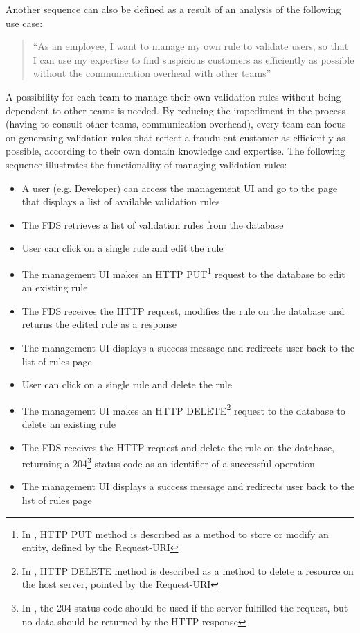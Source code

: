 Another sequence can also be defined as a result of an analysis of the following use case:

\begin{quotation}
 \enquote{As an employee, I want to manage my own rule to validate users, so that I can use my expertise to find suspicious customers as efficiently as possible without the communication overhead with other teams} 
\end{quotation}

A possibility for each team to manage their own validation rules without being dependent to other teams is needed. By reducing the impediment in the process (having to consult other teams, communication overhead), every team can focus on generating validation rules that reflect a fraudulent customer as efficiently as possible, according to their own domain knowledge and expertise. The following sequence illustrates the functionality of managing validation rules:

\begin{itemize}
 \item A user (e.g. Developer) can access the management UI and go to the page that displays a list of available validation rules
 \item The FDS retrieves a list of validation rules from the database
 \item User can click on a single rule and edit the rule
 \item The management UI makes an HTTP PUT\footnote{In \autocite[\enquote{9.6 PUT}]{http-rfc}, HTTP PUT method is described as a method to store or modify an entity, defined by the Request-URI} request to the database to edit an existing rule
 \item The FDS receives the HTTP request, modifies the rule on the database and returns the edited rule as a response
 \item The management UI displays a success message and redirects user back to the list of rules page
 \item User can click on a single rule and delete the rule
 \item The management UI makes an HTTP DELETE\footnote{In \autocite[\enquote{9.7 DELETE}]{http-rfc}, HTTP DELETE method is described as a method to delete a resource on the host server, pointed by the Request-URI} request to the database to delete an existing rule
 \item The FDS receives the HTTP request and delete the rule on the database, returning a 204\footnote{In \autocite[\enquote{10.2.5 204 No Content}]{http-rfc}, the 204 status code should be used if the server fulfilled the request, but no data should be returned by the HTTP response} status code as an identifier of a successful operation
 \item The management UI displays a success message and redirects user back to the list of rules page
\end{itemize} 


